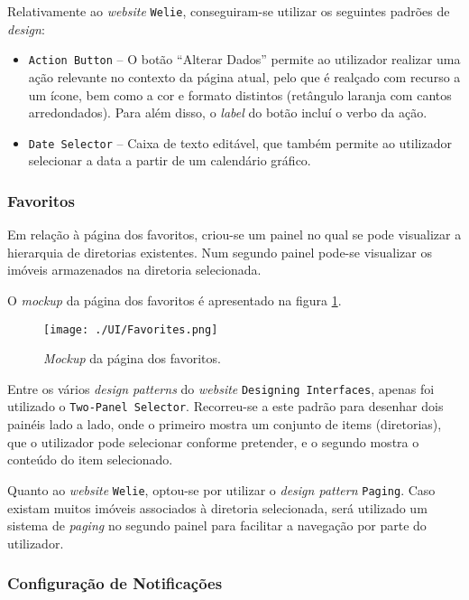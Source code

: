 Relativamente ao \textit{website} \texttt{Welie}, conseguiram-se utilizar os seguintes padrões de \textit{design}:

\begin{itemize}
    \item \texttt{Action Button} -- O botão ``Alterar Dados'' permite ao utilizador realizar uma ação relevante no contexto da página atual, pelo que é realçado com recurso a um ícone, bem como a cor e formato distintos (retângulo laranja com cantos arredondados). Para além disso, o \textit{label} do botão incluí o verbo da ação.
    
    \item \texttt{Date Selector} -- Caixa de texto editável, que também permite ao utilizador selecionar a data a partir de um calendário gráfico.
\end{itemize}

\subsubsection{Favoritos}

Em relação à página dos favoritos, criou-se um painel no qual se pode visualizar a hierarquia de diretorias existentes. Num segundo painel pode-se visualizar os imóveis armazenados na diretoria selecionada.

O \textit{mockup} da página dos favoritos é apresentado na figura \ref{fig:favorites}.

\begin{figure}[H]
    \centering
    \texttt{[image: ./UI/Favorites.png]}
    \caption{\textit{Mockup} da página dos favoritos.}
    \label{fig:favorites}
\end{figure}

Entre os vários \textit{design patterns} do \textit{website} \texttt{Designing Interfaces}, apenas foi utilizado o \texttt{Two-Panel Selector}. Recorreu-se a este padrão para desenhar dois painéis lado a lado, onde o primeiro mostra um conjunto de items (diretorias), que o utilizador pode selecionar conforme pretender, e o segundo mostra o conteúdo do item selecionado.

Quanto ao \textit{website} \texttt{Welie}, optou-se por utilizar o \textit{design pattern} \texttt{Paging}. Caso existam muitos imóveis associados à diretoria selecionada, será utilizado um sistema de \textit{paging} no segundo painel para facilitar a navegação por parte do utilizador.


\subsubsection{Configuração de Notificações}

